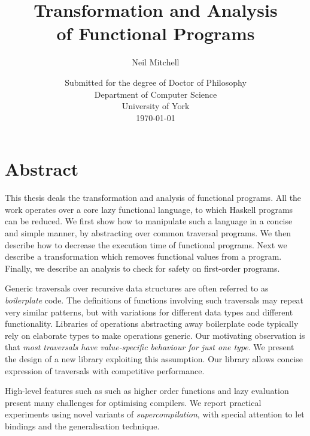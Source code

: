 
\title{Transformation and Analysis \\ of Functional Programs}
\author{Neil Mitchell}
\date{\normalsize{
    \vspace{20mm}
    Submitted for the degree of Doctor of Philosophy \\
    \vspace{10mm}
    Department of Computer Science \\
    University of York \\
    \today}}

\maketitle

\setcounter{page}{2}

\chapter*{Abstract}

This thesis deals the transformation and analysis of functional programs. All the work operates over a core lazy functional language, to which Haskell programs can be reduced. We first show how to manipulate such a language in a concise and simple manner, by abstracting over common traversal programs. We then describe how to decrease the execution time of functional programs. Next we describe a transformation which removes functional values from a program. Finally, we describe an analysis to check for safety on first-order programs.

Generic traversals over recursive data structures are often referred to as \textit{boilerplate} code. The definitions of functions involving such traversals may repeat very similar patterns, but with variations for different data types and different functionality. Libraries of operations abstracting away boilerplate code typically rely on elaborate types to make operations generic. Our motivating observation is that \textit{most traversals have value-specific behaviour for just one type}. We present the design of a new library exploiting this assumption. Our library allows concise expression of traversals with competitive performance.

High-level features such as such as higher order functions and lazy evaluation present many challenges for optimising compilers. We report practical experiments using novel variants of \textit{supercompilation}, with special attention to let bindings and the generalisation technique.

